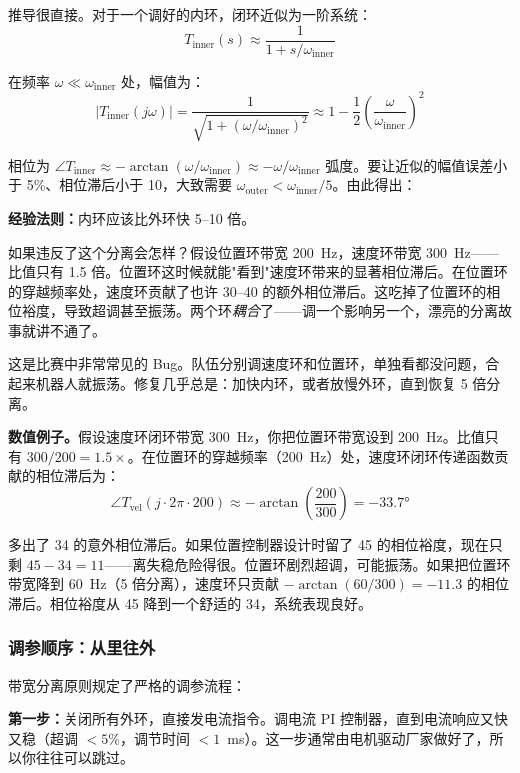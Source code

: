 推导很直接。对于一个调好的内环，闭环近似为一阶系统：
\begin{equation}
T_{\text{inner}}(s) \approx \frac{1}{1 + s/\omega_{\text{inner}}}
\end{equation}

在频率 $\omega \ll \omega_{\text{inner}}$ 处，幅值为：
\[
|T_{\text{inner}}(j\omega)| = \frac{1}{\sqrt{1 + (\omega/\omega_{\text{inner}})^2}} \approx 1 - \frac{1}{2}\left(\frac{\omega}{\omega_{\text{inner}}}\right)^2
\]

相位为 $\angle T_{\text{inner}} \approx -\arctan(\omega/\omega_{\text{inner}}) \approx -\omega/\omega_{\text{inner}}$ 弧度。要让近似的幅值误差小于 5\%、相位滞后小于 10\textdegree{}，大致需要 $\omega_{\text{outer}} < \omega_{\text{inner}} / 5$。由此得出：

\textbf{经验法则：}内环应该比外环快 5--10 倍。

如果违反了这个分离会怎样？假设位置环带宽 200~Hz，速度环带宽 300~Hz——比值只有 1.5 倍。位置环这时候就能"看到"速度环带来的显著相位滞后。在位置环的穿越频率处，速度环贡献了也许 30--40\textdegree{} 的额外相位滞后。这吃掉了位置环的相位裕度，导致超调甚至振荡。两个环\textit{耦合}了——调一个影响另一个，漂亮的分离故事就讲不通了。

这是比赛中非常常见的 Bug。队伍分别调速度环和位置环，单独看都没问题，合起来机器人就振荡。修复几乎总是：加快内环，或者放慢外环，直到恢复 5 倍分离。

\textbf{数值例子。}假设速度环闭环带宽 300~Hz，你把位置环带宽设到 200~Hz。比值只有 $300/200 = 1.5\times$。在位置环的穿越频率（200~Hz）处，速度环闭环传递函数贡献的相位滞后为：
\[
\angle T_{\text{vel}}(j \cdot 2\pi \cdot 200) \approx -\arctan\!\left(\frac{200}{300}\right) = -33.7°
\]

多出了 34\textdegree{} 的意外相位滞后。如果位置控制器设计时留了 45\textdegree{} 的相位裕度，现在只剩 $45 - 34 = 11$\textdegree{}——离失稳危险得很。位置环剧烈超调，可能振荡。如果把位置环带宽降到 60~Hz（5 倍分离），速度环只贡献 $-\arctan(60/300) = -11.3$\textdegree{} 的相位滞后。相位裕度从 45\textdegree{} 降到一个舒适的 34\textdegree{}，系统表现良好。

\subsubsection{调参顺序：从里往外}

带宽分离原则规定了严格的调参流程：

\textbf{第一步：}关闭所有外环，直接发电流指令。调电流 PI 控制器，直到电流响应又快又稳（超调 $<5\%$，调节时间 $<1$~ms）。这一步通常由电机驱动厂家做好了，所以你往往可以跳过。

